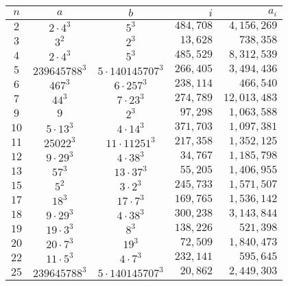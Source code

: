 \documentclass{jT}
\theoremstyle{definition}
\begin{document}
\begin{table}[ht]
\begin{center}
\begin{tabular}{||cccrr||} \hline 
$n$   &      $a$             &           $b$           &  $i$      &   $a_{i}$ \\ \hline
$2$   & $2 \cdot 4^{3}$      &         $5^{3}$         & $484,708$ &   $4,156,269$  \\ \hline
$3$   &     $3^{2}$          &         $2^{3}$         &  $13,628$ &     $738,358$  \\ \hline
$4$   & $2 \cdot 4^{3}$      &         $5^{3}$         & $485,529$ &   $8,312,539$  \\ \hline
$5$   & $239645788^{3}$      & $5 \cdot 140145707^{3}$ & $266,405$ &   $3,494,436$ \\ \hline
$6$   & $467^{3}$            &   $6 \cdot 257^{3}$     & $238,114$ &     $466,540$  \\ \hline
$7$   & $44^{3}$             &    $7 \cdot 23^{3}$     & $274,789$ &  $12,013,483$  \\ \hline
$9$   & $9$                  &         $2^{3}$         &  $97,298$ &   $1,063,588$ \\ \hline
$10$  & $5 \cdot 13^{3}$     &     $4 \cdot 14^{3}$    & $371,703$ &   $1,097,381$  \\ \hline
$11$  & $25022^{3}$          &  $11 \cdot 11251^{3}$   & $217,358$ &   $1,352,125$  \\ \hline
$12$  & $9 \cdot 29^{3}$     &    $4 \cdot 38^{3}$     &  $34,767$ &   $1,185,798$  \\ \hline
$13$  & $57^{3}$             &    $13 \cdot 37^{3}$    &  $55,205$ &   $1,406,955$  \\ \hline
$15$  & $5^{2}$              &     $3 \cdot 2^{3}$     & $245,733$ &   $1,571,507$  \\ \hline
$17$  & $18^{3}$             &     $17 \cdot 7^{3}$    & $169,765$ &   $1,536,142$  \\ \hline
$18$  & $9 \cdot 29^{3}$     &    $4 \cdot 38^{3}$     & $300,238$ &   $3,143,844$  \\ \hline
$19$  & $19 \cdot 3^{3}$     &         $8^{3}$         & $138,226$ &     $521,398$  \\ \hline
$20$  & $20 \cdot 7^{3}$     &         $19^{3}$        &  $72,509$ &   $1,840,473$  \\ \hline
$22$  & $11 \cdot 5^{3}$     &     $4 \cdot 7^{3}$     & $232,141$ &     $595,645$  \\ \hline
$25$  & $239645788^{3}$      & $5 \cdot 140145707^{3}$ &  $20,862$ &   $2,449,303$  \\ \hline

\end{tabular}
\end{center}
\end{table}
\end{document}
